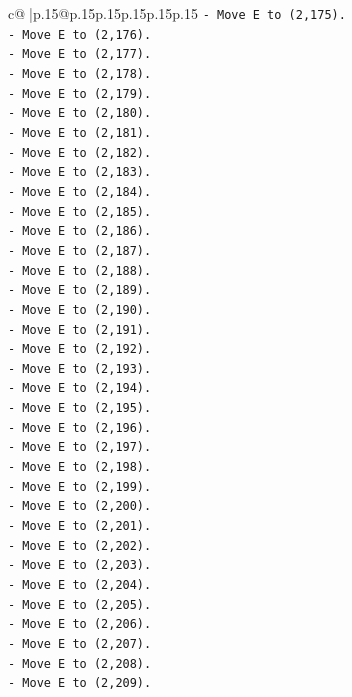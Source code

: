 \documentclass{article}
\begin{document}
{\begin{supertabular}{c@{$\;$}|p{.15\linewidth}@{}p{.15\linewidth}p{.15\linewidth}p{.15\linewidth}p{.15\linewidth}p{.15\linewidth}}
{{{\texttt{{-} Move E to (2,175).} \\
\texttt{{-} Move E to (2,176).} \\
\texttt{{-} Move E to (2,177).} \\
\texttt{{-} Move E to (2,178).} \\
\texttt{{-} Move E to (2,179).} \\
\texttt{{-} Move E to (2,180).} \\
\texttt{{-} Move E to (2,181).} \\
\texttt{{-} Move E to (2,182).} \\
\texttt{{-} Move E to (2,183).} \\
\texttt{{-} Move E to (2,184).} \\
\texttt{{-} Move E to (2,185).} \\
\texttt{{-} Move E to (2,186).} \\
\texttt{{-} Move E to (2,187).} \\
\texttt{{-} Move E to (2,188).} \\
\texttt{{-} Move E to (2,189).} \\
\texttt{{-} Move E to (2,190).} \\
\texttt{{-} Move E to (2,191).} \\
\texttt{{-} Move E to (2,192).} \\
\texttt{{-} Move E to (2,193).} \\
\texttt{{-} Move E to (2,194).} \\
\texttt{{-} Move E to (2,195).} \\
\texttt{{-} Move E to (2,196).} \\
\texttt{{-} Move E to (2,197).} \\
\texttt{{-} Move E to (2,198).} \\
\texttt{{-} Move E to (2,199).} \\
\texttt{{-} Move E to (2,200).} \\
\texttt{{-} Move E to (2,201).} \\
\texttt{{-} Move E to (2,202).} \\
\texttt{{-} Move E to (2,203).} \\
\texttt{{-} Move E to (2,204).} \\
\texttt{{-} Move E to (2,205).} \\
\texttt{{-} Move E to (2,206).} \\
\texttt{{-} Move E to (2,207).} \\
\texttt{{-} Move E to (2,208).} \\
\texttt{{-} Move E to (2,209).} \\
}}}
\end{supertabular}}
\end{document}
